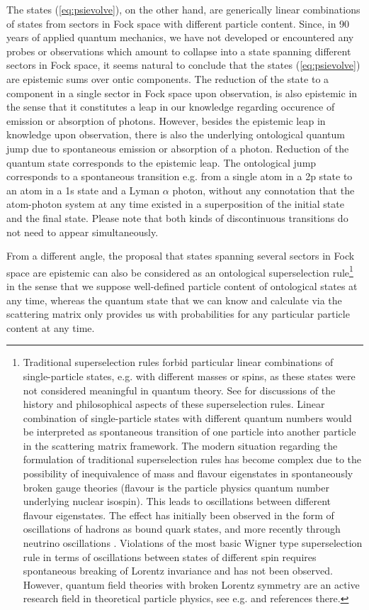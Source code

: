 \documentclass[final,3p,times,twocolumn]{elsarticle3}
\begin{document}
The states (\ref{eq:psievolve}), on the other hand, are generically linear
combinations of states from sectors in Fock space with different particle content.
Since, in 90 years of applied quantum mechanics,
we have not developed or encountered any probes or observations which amount to
collapse into a state spanning different sectors in Fock space, it seems natural
to conclude that the states (\ref{eq:psievolve}) are epistemic sums over
ontic components. The reduction of the state to a component in a single sector
in Fock space upon observation, is also epistemic in the sense that it constitutes 
a leap in our knowledge regarding occurence of emission or absorption of photons. 
However, besides the epistemic leap in knowledge upon observation, there is also 
the underlying ontological quantum jump due to spontaneous emission or absorption 
of a photon. Reduction of the quantum state corresponds to the epistemic leap. The 
ontological jump corresponds to a spontaneous transition e.g. from a single atom
in a 2p state to an atom in a 1s state and a Lyman $\alpha$ photon, without
any connotation that the atom-photon system at any time existed in a
superposition of the initial state and the final state. Please note that
both kinds of discontinuous transitions do not need to appear simultaneously.

 From a different angle, the proposal that states spanning several sectors 
in Fock space are epistemic can also be considered as an ontological 
superselection rule\footnote{Traditional superselection rules forbid
particular linear combinations of single-particle states, e.g. with different 
masses or spins, as these states were not considered meaningful in quantum theory. 
See \cite{earman,ruetsche} for discussions of the history and philosophical aspects 
of these superselection rules. Linear combination of single-particle states 
with different quantum numbers would be
interpreted as spontaneous transition of one particle into another
particle in the scattering matrix framework. 
The modern situation regarding the formulation of traditional 
superselection rules has become complex due to the possibility
of inequivalence of mass and flavour eigenstates in spontaneously broken
gauge theories (flavour is the particle physics quantum number underlying 
nuclear isospin). This leads to oscillations between different flavour
eigenstates. The effect has initially been observed in the form of 
oscillations of hadrons as bound quark states, and more recently
through neutrino oscillations \cite{sk,sno}. Violations of the 
most basic Wigner type superselection rule in terms of oscillations
between states of different spin requires spontaneous breaking
of Lorentz invariance and has not been observed. However, quantum field
theories with broken Lorentz symmetry are an active research field 
in theoretical particle physics, see e.g. \cite{lsb1,lsb2} 
and references there.} 
in the sense that we suppose well-defined particle
content of ontological states at any time, whereas the quantum state 
that we can know and calculate via the scattering matrix only provides
us with probabilities for any particular particle content at any time.
\end{document}
